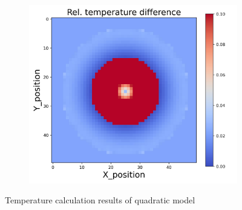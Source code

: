 \begin{figure}[h]
\begin{minipage}{\textwidth}
\begin{subfigure}{0.3\textwidth}
        \end{subfigure}
        \begin{subfigure}{0.3\textwidth}
            \centering
            \includegraphics[width=\textwidth]{figures/raw_data/33/quad/T_bias.jpg}
        \end{subfigure}
    \end{minipage}
    \caption{Temperature calculation results of quadratic model}  
\end{figure}
